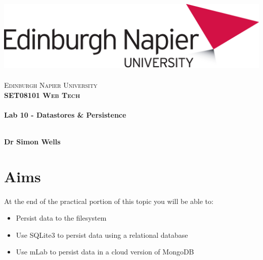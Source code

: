 \documentclass[10pt, a4paper, twosize]{article}
\begin{document}

\begin{titlepage}
\vspace*{5cm}
\begin{center}
\includegraphics[width=.5\textwidth]{images/EdNapUniLogoCMYK}~\\[1cm]

\textsc{\Large Edinburgh Napier University}\\[1.5cm]

\textsc{\LARGE \bfseries SET08101 Web Tech}\\[0.5cm]

\hrulefill \\[0.4cm]
{\huge \bfseries Lab 10 - Datastores \& Persistence \\[0.4cm] }
\hrulefill \\[1.5cm]

\begin{minipage}{0.4\textwidth}
\begin{flushleft} \large
\textbf{Dr Simon Wells} \\
\end{flushleft}
\end{minipage}

\vfill

\end{center}
\end{titlepage}




%

\section{Aims}
\paragraph{} At the end of the practical portion of this topic you will be able to:

\begin{itemize}
\item Persist data to the filesystem
\item Use SQLite3 to persist data using a relational database
\item Use mLab to persist data in a cloud version of MongoDB
\end{itemize}
\end{document}
